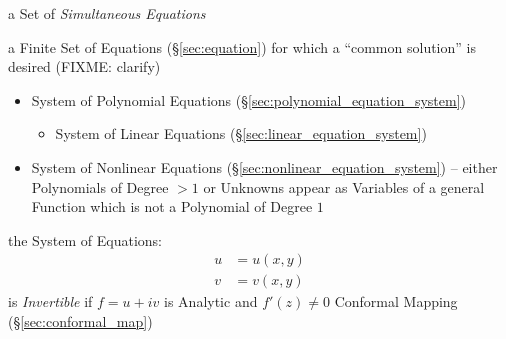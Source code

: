 a Set of \emph{Simultaneous Equations}

a Finite Set of Equations (\S\ref{sec:equation}) for which a ``common
solution'' is desired (FIXME: clarify)

\begin{itemize}
  \item System of Polynomial Equations
    (\S\ref{sec:polynomial_equation_system})
  \begin{itemize}
    \item System of Linear Equations (\S\ref{sec:linear_equation_system})
  \end{itemize}
  \item System of Nonlinear Equations
    (\S\ref{sec:nonlinear_equation_system}) -- either Polynomials of Degree
    $>1$ or Unknowns appear as Variables of a general Function which is not a
    Polynomial of Degree $1$
\end{itemize}


the System of Equations:
\begin{align*}
  u & = u(x,y) \\
  v & = v(x,y)
\end{align*}
is \emph{Invertible} if $f = u + iv$ is Analytic and $f'(z) \neq 0$ \fist
Conformal Mapping (\S\ref{sec:conformal_map})

